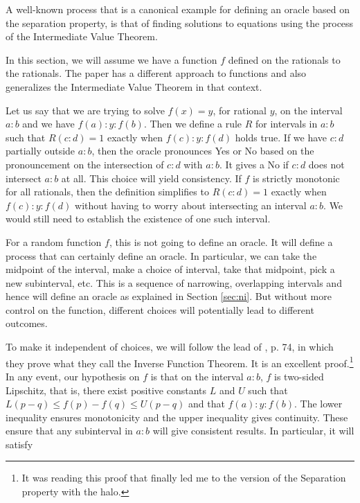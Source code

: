 \documentclass[12pt]{article}
\begin{document}
A well-known process that is a canonical example for defining an oracle based on the separation property, is that of finding solutions to equations using the process of the Intermediate Value Theorem. 

In this section, we will assume we have a function $f$ defined on the rationals to the rationals. The paper \cite{taylor23funora} has a different approach to functions and also generalizes the Intermediate Value Theorem in that context. 

Let us say that we are trying to solve $f(x) = y$, for rational $y$, on the interval $a:b$ and we have $f(a):y:f(b)$. Then we define a rule $R$ for intervals in $a:b$ such that $R(c:d) = 1$ exactly when $f(c):y:f(d)$ holds true. If we have $c:d$ partially outside $a:b$, then the oracle pronounces Yes or No based on the pronouncement on the intersection of $c:d$ with $a:b$. It gives a No if $c:d$ does not intersect $a:b$ at all. This choice will yield consistency. If $f$ is strictly monotonic for all rationals, then the definition simplifies to $R(c:d)=1$ exactly when $f(c):y:f(d)$ without having to worry about intersecting an interval $a:b$. We would still need to establish the existence of one such interval. 

For a random function $f$, this is not going to define an oracle. It will define a process that can certainly define an oracle. In particular, we can take the midpoint of the interval, make a choice of interval, take that midpoint, pick a new subinterval, etc. This is a sequence of narrowing, overlapping intervals and hence will define an oracle as explained in Section \ref{sec:ni}. But without more control on the function, different choices will potentially lead to different outcomes. 

To make it independent of choices, we will follow the lead of \cite{bridger}, p. 74, in which they prove what they call the Inverse Function Theorem. It is an excellent proof.\footnote{It was reading this proof that finally led me to the version of the Separation property with the halo.} In any event, our hypothesis on $f$ is that on the interval $a:b$, $f$ is two-sided Lipschitz, that is, there exist positive constants $L$ and $U$ such that $L (p-q) \leq f(p) - f(q) \leq U (p-q)$ and that $f(a):y:f(b)$. The lower inequality ensures monotonicity and the upper inequality gives continuity. These ensure that any subinterval in $a:b$ will give consistent results. In particular, it will satisfy
\end{document}

